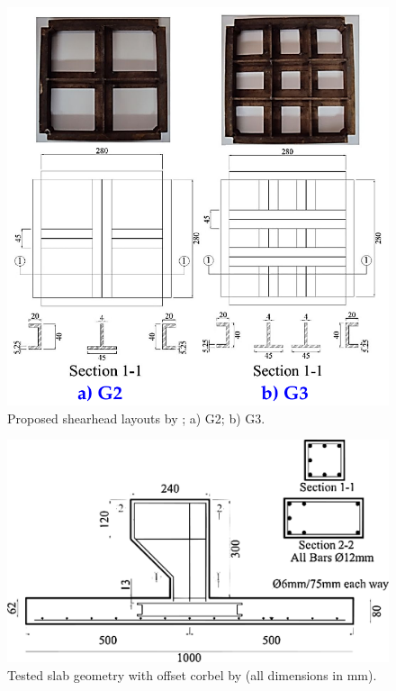 \begin{figure}\centering
\includegraphics[width=\columnwidth]{Figures/tikzout/ahf5.pdf}
\caption{Proposed shearhead layouts by \cite{Al-hamd2018}; a) G2; b) G3. }\label{ahf5}
\end{figure}
\begin{figure}\centering
\includegraphics[width=\columnwidth]{Figures/ahf4.pdf}
\caption{Tested slab geometry with offset corbel by \cite{Al-hamd2018} (all dimensions in mm).}\label{ahf4}
\end{figure}

